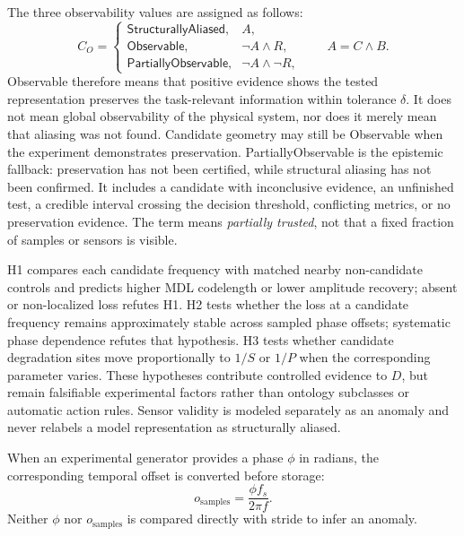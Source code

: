 \documentclass[
	letterpaper,
	10pt,
	unnumberedsections,
	twoside,
]{LTJournalArticle}
\newcommand{\valueof}[1]{\textsf{#1}}
\begin{document}
The three observability values are assigned as follows:
\begin{equation}
C_O=
\begin{cases}
\valueof{StructurallyAliased}, & A,\\
\valueof{Observable}, & \neg A\wedge R,\\
\valueof{PartiallyObservable}, & \neg A\wedge\neg R,
\end{cases}
\qquad A=C\wedge B.
\label{eq:observability-state}
\end{equation}
\valueof{Observable} therefore means that positive evidence shows the tested representation preserves the task-relevant information within tolerance $\delta$. It does not mean global observability of the physical system, nor does it merely mean that aliasing was not found. Candidate geometry may still be \valueof{Observable} when the experiment demonstrates preservation. \valueof{PartiallyObservable} is the epistemic fallback: preservation has not been certified, while structural aliasing has not been confirmed. It includes a candidate with inconclusive evidence, an unfinished test, a credible interval crossing the decision threshold, conflicting metrics, or no preservation evidence. The term means \emph{partially trusted}, not that a fixed fraction of samples or sensors is visible.

H1 compares each candidate frequency with matched nearby non-candidate controls and predicts higher MDL codelength or lower amplitude recovery; absent or non-localized loss refutes H1. H2 tests whether the loss at a candidate frequency remains approximately stable across sampled phase offsets; systematic phase dependence refutes that hypothesis. H3 tests whether candidate degradation sites move proportionally to $1/S$ or $1/P$ when the corresponding parameter varies. These hypotheses contribute controlled evidence to $D$, but remain falsifiable experimental factors rather than ontology subclasses or automatic action rules. Sensor validity is modeled separately as an anomaly and never relabels a model representation as structurally aliased.

When an experimental generator provides a phase $\phi$ in radians, the corresponding temporal offset is converted before storage:
\begin{equation}
o_{\mathrm{samples}}=\frac{\phi f_s}{2\pi f}.
\label{eq:phase-conversion}
\end{equation}
Neither $\phi$ nor $o_{\mathrm{samples}}$ is compared directly with stride to infer an anomaly.
\end{document}
